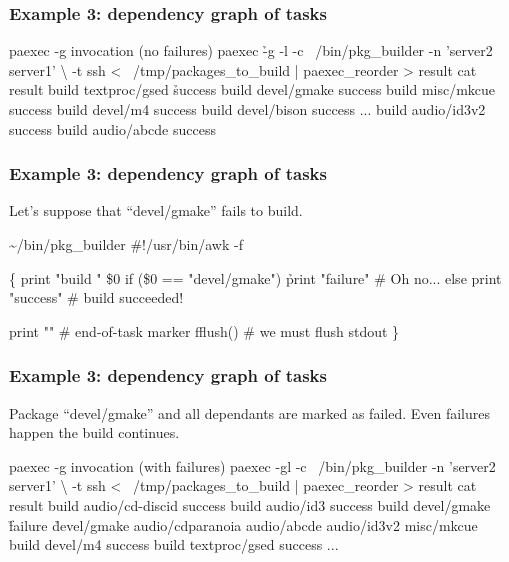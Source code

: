 \documentclass[hyperref={colorlinks=true}]{beamer}
\begin{document}
\begin{frame}[fragile]
  \frametitle{Example 3: dependency graph of tasks}

  \begin{block}{}
      \begin{CodeSmall}{paexec -g invocation (no failures)}
\prompt{\$} paexec \h{-g} -l -c ~/bin/pkg_builder -n 'server2 server1' \textbackslash
    -t ssh < ~/tmp/packages_to_build | paexec_reorder > result
\prompt{\$} cat result
build textproc/gsed
\h{success}
build devel/gmake
success
build misc/mkcue
success
build devel/m4
success
build devel/bison
success
...
build audio/id3v2
success
build audio/abcde
success
\prompt{\$}
      \end{CodeSmall}
  \end{block}
\end{frame}

\begin{frame}[fragile]
  \frametitle{Example 3: dependency graph of tasks}
Let's suppose that ``devel/gmake'' fails to build.

  \begin{block}{}
      \begin{CodeSmall}{\~{}/bin/pkg\_builder}
#!/usr/bin/awk -f

\{
   print "build " \$0
   if (\$0 == "devel/gmake")
      \h{print "failure"} # Oh no...
   else
      print "success" # build succeeded!

   print ""        # end-of-task marker
   fflush()        # we must flush stdout
\}
      \end{CodeSmall}
  \end{block}
\end{frame}

\begin{frame}[fragile]
  \frametitle{Example 3: dependency graph of tasks}
Package ``devel/gmake'' and all dependants are marked as failed.
Even failures happen the build continues.
  \begin{block}{}
      \begin{CodeSmall}{paexec -g invocation (with failures)}
\prompt{\$} paexec -gl -c ~/bin/pkg_builder -n 'server2 server1' \textbackslash
    -t ssh < ~/tmp/packages_to_build | paexec_reorder > result
\prompt{\$} cat result
build audio/cd-discid
success
build audio/id3
success
build devel/gmake
\h{failure}
\h{devel/gmake audio/cdparanoia audio/abcde audio/id3v2 misc/mkcue}
build devel/m4
success
build textproc/gsed
success
...
\prompt{\$}
      \end{CodeSmall}
  \end{block}
\end{frame}
\end{document}
